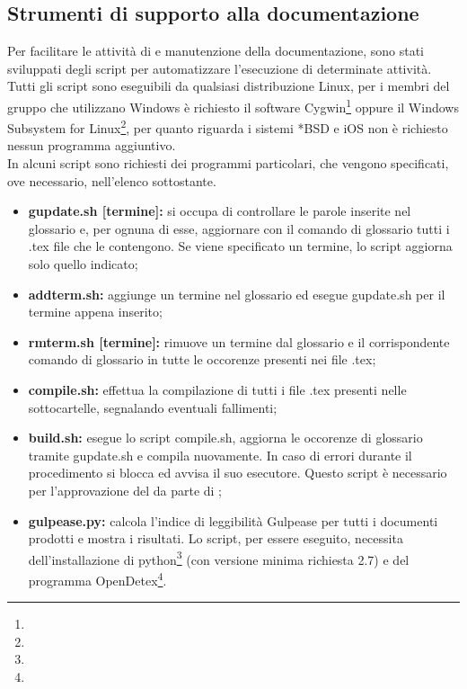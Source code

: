 \documentclass[NormeDiProgetto.tex]{subfiles}
\begin{document}
	\subsection{Strumenti di supporto alla documentazione}
	Per facilitare le attività di  e manutenzione della documentazione, sono stati sviluppati degli script per automatizzare l'esecuzione di determinate attività. \\
	Tutti gli script sono eseguibili da qualsiasi distribuzione Linux, per i membri del gruppo che utilizzano Windows è richiesto il software Cygwin\footnote{} oppure il Windows Subsystem for Linux\footnote{}, per quanto riguarda i sistemi *BSD e iOS non è richiesto nessun programma aggiuntivo.\\
	In alcuni script sono richiesti dei programmi particolari, che vengono specificati, ove necessario, nell'elenco sottostante.
	\begin{itemize}
		\item \textbf{gupdate.sh [termine]:} si occupa di controllare le parole inserite nel glossario e, per ognuna di esse, aggiornare con il comando di glossario tutti i .tex file che le contengono. Se viene specificato un termine, lo script aggiorna solo quello indicato;
		\item \textbf{addterm.sh:} aggiunge un termine nel glossario ed esegue gupdate.sh per il termine appena inserito;
		\item \textbf{rmterm.sh [termine]:} rimuove un termine dal glossario e il corrispondente comando di glossario in tutte le occorenze presenti nei file .tex;
		\item \textbf{compile.sh:} effettua la compilazione di tutti i file .tex presenti nelle sottocartelle, segnalando eventuali fallimenti;
		\item \textbf{build.sh:} esegue lo script compile.sh, aggiorna le occorenze di glossario tramite gupdate.sh e compila nuovamente. In caso di errori durante il procedimento si blocca ed avvisa il suo esecutore. Questo script è necessario per l'approvazione del  da parte di ;
		\item \textbf{gulpease.py:} calcola l'indice di leggibilità Gulpease per tutti i documenti prodotti e mostra i risultati. Lo script, per essere eseguito, necessita dell'installazione di python\footnote{} (con versione minima richiesta 2.7) e del programma OpenDetex\footnote{}.	
	\end{itemize}
	
\end{document}
